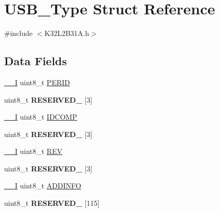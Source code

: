 \hypertarget{struct_u_s_b___type}{}\section{U\+S\+B\+\_\+\+Type Struct Reference}
\label{struct_u_s_b___type}


{\ttfamily \#include $<$K32\+L2\+B31\+A.\+h$>$}

\subsection*{Data Fields}
\begin{DoxyCompactItemize}
\item 
\mbox{\hyperlink{core__cm0plus_8h_af63697ed9952cc71e1225efe205f6cd3}{\+\_\+\+\_\+I}} uint8\+\_\+t \mbox{\hyperlink{struct_u_s_b___type_a077edc39b83ba91d23059f34a17d48fb}{P\+E\+R\+ID}}
\item 
\mbox{\label{struct_u_s_b___type_a6d02c9345b2d39c945c905d46077a0ec}} 
uint8\+\_\+t {\bfseries R\+E\+S\+E\+R\+V\+E\+D\+\_} \mbox{[}3\mbox{]}
\item 
\mbox{\hyperlink{core__cm0plus_8h_af63697ed9952cc71e1225efe205f6cd3}{\+\_\+\+\_\+I}} uint8\+\_\+t \mbox{\hyperlink{struct_u_s_b___type_aa175a27eddae37d758847685effe7ab0}{I\+D\+C\+O\+MP}}
\item 
\mbox{\label{struct_u_s_b___type_a8920d7bfe319ce3f5af958ad4c8f2cca}} 
uint8\+\_\+t {\bfseries R\+E\+S\+E\+R\+V\+E\+D\+\_} \mbox{[}3\mbox{]}
\item 
\mbox{\hyperlink{core__cm0plus_8h_af63697ed9952cc71e1225efe205f6cd3}{\+\_\+\+\_\+I}} uint8\+\_\+t \mbox{\hyperlink{struct_u_s_b___type_a9131f08aa5a24b8c9ef95d51f62810de}{R\+EV}}
\item 
\mbox{\label{struct_u_s_b___type_a76a9ec2331c09e8e213dfb169fbac870}} 
uint8\+\_\+t {\bfseries R\+E\+S\+E\+R\+V\+E\+D\+\_} \mbox{[}3\mbox{]}
\item 
\mbox{\hyperlink{core__cm0plus_8h_af63697ed9952cc71e1225efe205f6cd3}{\+\_\+\+\_\+I}} uint8\+\_\+t \mbox{\hyperlink{struct_u_s_b___type_a3b414f3639d8e9ccdeccf5ec15029b9c}{A\+D\+D\+I\+N\+FO}}
\item 
\mbox{\label{struct_u_s_b___type_a27f1dbf3854e4752eb98861e498965fb}} 
uint8\+\_\+t {\bfseries R\+E\+S\+E\+R\+V\+E\+D\+\_} \mbox{[}115\mbox{]}

\end{DoxyCompactItemize}
